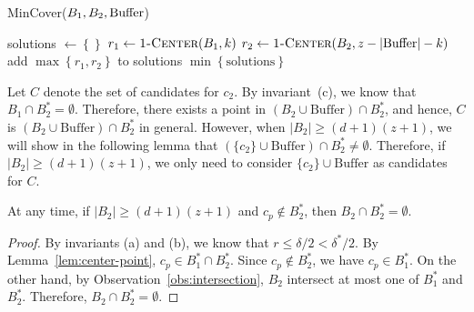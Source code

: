 \documentclass[envcountsame]{cls/cccg15}
\newcommand{\cp}{c_p}
\newcommand{\dz}{(d + 1)(z + 1)}
\newcommand{\Buffer}{\ensuremath{\text{Buffer}}}
\newcommand{\Call}[2]{\textsc{#1}(#2)}
\newcommand{\set}[1]{\left\{ #1 \right\}}
\newcommand{\card}[1]{\left|{#1}\right|}
\newcommand{\lee}{\leqslant}
\newcommand{\gee}{\geqslant}
\renewcommand{\leq}{\lee}
\renewcommand{\geq}{\gee}
\renewcommand{\ge}{\gee}
\begin{document}
\begin{algorithm}
\caption{\sc MinCover($B_1, B_2, \text{\rm Buffer}$)} 
\label{alg:compute-min}
\begin{algorithmic}[1]
	\STATE solutions $\gets \set{}$
	\FOR{$k \gets 0, \dots,(z - \card{\mbox{Buffer}})$}
		\STATE $r_1 \gets \Call{1-Center}{B_1, k}$
		\STATE $r_2 \gets \Call{1-Center}{B_2, z - \card{\mbox{Buffer}} - k}$
		\STATE add $\max \set{r_1, r_2}$ to solutions
	\ENDFOR
	\RETURN $\min\set{\text{solutions}}$
\end{algorithmic}
\end{algorithm}


Let $C$ denote the set of candidates for $c_2$.
By invariant~(c), we know that $B_1 \cap B_2^* = \emptyset$. 
Therefore, there exists a point in $(B_2 \cup \Buffer) \cap B_2^*$,
and hence, $C$ is $(B_2 \cup \Buffer) \cap B_2^*$ in general.
However, when $|B_2| \geq \dz$, 
we will show in the following lemma that $(\{c_2\} \cup \Buffer) \cap B_2^* \neq \emptyset$. 
Therefore, if $|B_2| \ge \dz$, 
we only need to consider $\{c_2\} \cup \Buffer$ as candidates for $C$.



\begin{lemma}
\label{lem:B2dz}
	At any time, 
	if $|B_2| \ge \dz$ and $\cp \not\in B_2^*$,
	then $B_2 \cap B_2^* = \emptyset$.
\end{lemma}

\begin{proof}
	By invariants (a) and (b), we know that $r \leq \delta/2 < \delta^*/2$. 
	By Lemma~\ref{lem:center-point}, $c_p \in B_1^* \cap B_2^*$. 
	Since $c_p \not \in B_2^*$, we have $c_p \in B_1^*$. 
	On the other hand, by Observation~\ref{obs:intersection}, 
	$B_2$ intersect at most one of $B_1^*$ and $B_2^*$. 
	Therefore, $B_2 \cap B_2^* = \emptyset$.
\end{proof}
\end{document}
